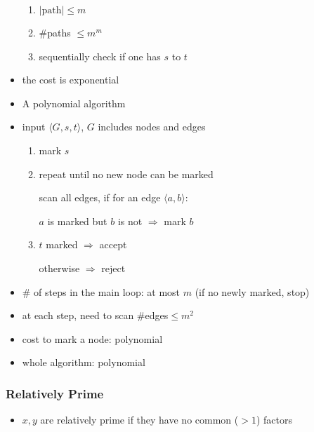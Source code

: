 \begin{frame}[allowframebreaks]
\begin{itemize}
\begin{enumerate}
  \item $|\text{path}|\leq m$

  \item \#paths $\leq m^m$

  \item sequentially check if one has $s$ to $t$

  \end{enumerate}
  \item the cost is exponential  
\item A polynomial algorithm

\item [] input $\langle  G,s,t\rangle $, $G$ includes nodes and edges
\begin{enumerate}
\item mark $s$


\item repeat until no new node can be marked

  \quad scan all edges, if for an edge $\langle  a,b\rangle $:
  \begin{center}
  $a$ is marked but $b$ is not
$\Rightarrow $ mark $b$
\end{center}
\item $t$ marked $\Rightarrow$ accept

otherwise $\Rightarrow$ reject
\end{enumerate}
\item \# of steps in the main loop: at most $m$ (if no newly marked, stop)
\item at each step, need to scan \#edges$\leq m^2$
\item cost to mark a node: polynomial
\item whole algorithm: polynomial
\end{itemize}\end{frame} \begin{frame}[allowframebreaks] \frametitle{Relatively Prime}
  \begin{itemize}
\item $x,y$ are relatively prime if they have no common ($> 1$) factors


\end{itemize}
\end{frame}
